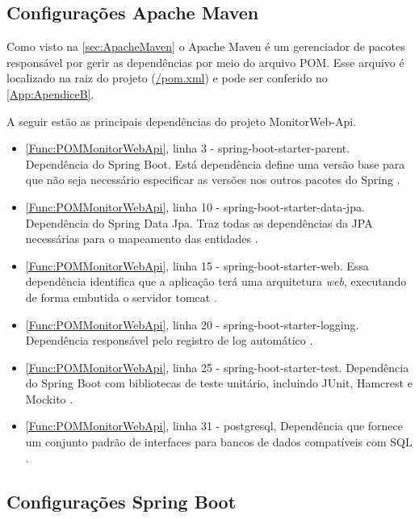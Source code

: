 \subsection{Configurações Apache Maven}\label{subsec:ConfiguraçõesApacheMaven}

Como visto na \autoref{sec:ApacheMaven} o Apache Maven é um gerenciador de pacotes responsável por gerir as dependências por meio do arquivo POM.
Esse arquivo é localizado na raiz do projeto (\url{/pom.xml}) e pode ser conferido no \autoref{App:ApendiceB}.

A seguir estão as principais dependências do projeto MonitorWeb-Api.

\begin{itemize}\label{List:Pom}
		\item \autoref{Func:POMMonitorWebApi}, linha 3 - spring-boot-starter-parent. Dependência do Spring Boot. Está dependência define uma versão base para que não seja necessário especificar as versões nos outros pacotes do Spring \cite{springBoot:2017}.
		
		\item \autoref{Func:POMMonitorWebApi}, linha 10 - spring-boot-starter-data-jpa. Dependência do Spring Data Jpa. Traz todas as dependências da JPA necessárias para o mapeamento das entidades \cite{springDataJpa:2017}.
		
		\item \autoref{Func:POMMonitorWebApi}, linha 15 - spring-boot-starter-web. Essa dependência identifica que a aplicação terá uma arquitetura \textit{web}, executando de forma embutida o servidor tomcat \cite{springBoot:2017}.
		
		\item \autoref{Func:POMMonitorWebApi}, linha 20 - spring-boot-starter-logging. Dependência responsável pelo registro de log automático \cite{springBoot:2017}.
		
		\item \autoref{Func:POMMonitorWebApi}, linha 25 - spring-boot-starter-test. Dependência do Spring Boot com bibliotecas de teste unitário, incluindo JUnit, Hamcrest e Mockito \cite{springBoot:2017}.
		
		\item \autoref{Func:POMMonitorWebApi}, linha 31 - postgresql, Dependência que fornece um conjunto padrão de interfaces para bancos de dados compatíveis com SQL \cite{PostgreSQL:2017}.
	
\end{itemize}


\subsection{Configurações Spring Boot}\label{subsec:ConfiguraçõesApplicationProperties}

